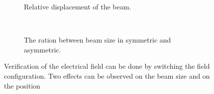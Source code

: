 \begin{figure}[!ht]
  \begin{subfigure}[t]{0.5\textwidth}
    
    \caption{Relative displacement of the beam.}
    \label{chap4:COMSOL_check_a}
  \end{subfigure}
  ~
  \begin{subfigure}[t]{0.5\textwidth}
    
    \caption{The ration between beam size in symmetric and asymmetric.}
    \label{chap4:COMSOL_check_b}
  \end{subfigure}
  \caption[Verification of the electrical field can be done by switching the field configuration]{Verification of the electrical field can be done by switching the field configuration. Two effects can be observed on the beam size and on the position}
  \label{chap4:COMSOL_check}
\end{figure}
